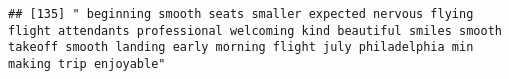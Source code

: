 \documentclass[
]{article}
\begin{document}
\begin{verbatim}
## [135] " beginning smooth seats smaller expected nervous flying flight attendants professional welcoming kind beautiful smiles smooth takeoff smooth landing early morning flight july philadelphia min making trip enjoyable"                                                                                                                                                                                                                                                                                                                                                                                                                                                                                                                                                                                                                                                                                                                                                                                                                                                                                                                                                                                                                                                                                                                                                                                                                                                                                                                                                                                                                                                                                                                                                                         

\end{verbatim}
\end{document}
